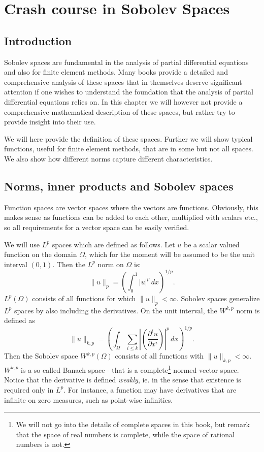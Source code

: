 \chapter{Crash course in Sobolev Spaces}

\label{chap-sobolev}
\section{Introduction}

Sobolev spaces are fundamental in the analysis of partial differential equations and also for 
finite element methods. Many books provide a detailed and comprehensive analysis of these spaces
that in themselves deserve significant attention if one wishes to understand the foundation that
the analysis of partial differential equations relies on. In this chapter we will however not
provide a comprehensive mathematical description of these spaces, but rather try to provide 
insight into their use. 

We will here provide the definition of these spaces. Further we will show typical functions, useful
for finite element methods,  that are in some but not all spaces. We also show how different norms
capture different characteristics.   

\section{Norms, inner products and Sobolev spaces}

Function spaces are vector spaces where the vectors are functions. Obviously, this makes
sense as functions can be added to each other, multiplied with scalars etc.,  so all 
requirements for a vector space can be easily verified. 

We will use $L^p$ spaces which are  defined as follows.  
Let $u$ be a scalar valued function on the domain $\Omega$, which for 
the moment will be assumed to be the unit interval $(0,1)$. Then the $L^p$ norm on $\Omega$ is:    
\[
\|u\|_p = (\int_0^1 |u|^p \, dx)^{1/p} .    
\]
$L^p(\Omega)$ consists of all functions for which $\|u\|_p < \infty$. 
Sobolev spaces generalize $L^p$ spaces by also including the derivatives.  
On the unit interval, the $W^{k,p}$ norm is defined as  
\begin{equation}
\label{Wpk}
\|u\|_{k,p} = (\int_\Omega \sum_{i \le k} |(\frac{\partial^i u}{\partial x^i}) |^p \, dx)^{1/p} .    
\end{equation}
Then the Sobolev space $W^{k,p}(\Omega)$ consists of 
all functions with $\|u\|_{k,p} < \infty$. $W^{k,p}$ is a so-called Banach space - that is 
a complete\footnote{We will not go into the details of complete spaces in this book, but remark that
the space of real numbers is complete, while the space of rational numbers is not. } normed vector space. 
Notice that the derivative is defined \emph{weakly}, ie. in the sense that existence is required only in $L^p$. For instance, 
a function may have derivatives that are infinite on zero measures, such as point-wise infinities. 

